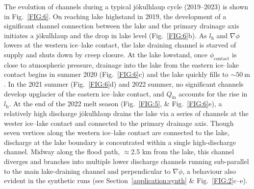 \documentclass[tc, manuscript]{copernicus}
\begin{document}
The evolution of channels during a typical jökulhlaup cycle (2019--2023) is shown in Fig.~\ref{FIG:6}. On reaching lake highstand in 2019, the development of a significant channel connection between the lake and the primary drainage axis initiates a jökulhlaup and the drop in lake level (Fig.~\ref{FIG:6}b). As $l_{\mathrm{h}}$ and $\nabla\phi$ lowers at the western ice--lake contact, the lake draining channel is starved of supply and shuts down by creep closure. At the lake lowstand, once $\phi_{\mathrm{contact}}$ is close to atmospheric pressure, drainage into the lake from the eastern ice--lake contact begins in summer 2020 (Fig.~\ref{FIG:6}c) and the lake quickly fills to $\sim 50\ \mathrm{m}$. In the 2021 summer (Fig.~\ref{FIG:6}d) and 2022 summer, no significant channels develop upglacier of the eastern ice--lake contact, and $Q_{\mathrm{in}}$ accounts for the rise in $l_{\mathrm{h}}$. At the end of the 2022 melt season (Fig.~\ref{FIG:5}, \& Fig.~\ref{FIG:6}e), a relatively high discharge jökulhlaup drains the lake via a series of channels at the wester ice--lake contact and connected to the primary drainage axis. Though seven vertices along the western ice--lake contact are connected to the lake, discharge at the lake boundary is concentrated within a single high-discharge channel. Midway along the flood path, $\approx$2.5 km from the lake, this channel diverges and branches into multiple lower discharge channels running sub-parallel to the main lake-draining channel and perpendicular to $\nabla \phi$, a behaviour also evident in the synthetic runs (see Section~\ref{application:synth} \& Fig.~\ref{FIG:2}c--e). 
\end{document}
